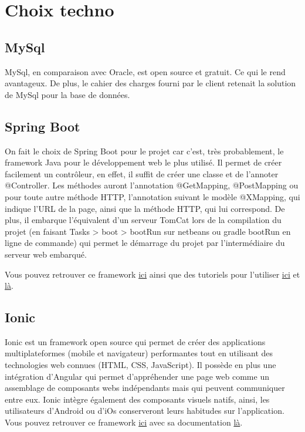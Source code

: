 	\section{Choix techno}

		\subsection{MySql}

			MySql, en comparaison avec Oracle, est open source et gratuit. Ce qui le rend avantageux. \newline
			De plus, le cahier des charges fourni par le client retenait la solution de MySql pour la base de données.

		\subsection{Spring Boot}

			On fait le choix de Spring Boot pour le projet car c'est, très probablement, le framework Java pour le développement web le plus utilisé. \newline
			Il permet de créer facilement un contrôleur, en effet, il suffit de créer une classe et de l’annoter @Controller. Les méthodes auront l’annotation @GetMapping, @PostMapping ou pour toute autre méthode HTTP, l'annotation suivant le modèle @XMapping, qui indique l'URL de la page, ainsi que la méthode HTTP, qui lui correspond.\newline
			De plus, il embarque l'équivalent d'un serveur TomCat lors de la compilation du projet (en faisant Tasks > boot > bootRun sur netbeans ou gradle bootRun en ligne de commande) qui permet le démarrage du projet par l'intermédiaire du serveur web embarqué. \newline

			\noindent
			Vous pouvez retrouver ce framework \href{https://spring.io/projects/spring-boot}{ici} ainsi que des tutoriels pour l'utiliser \href{https://www.tutorialspoint.com/spring_boot/index.htm}{ici} et \href{https://www.javatpoint.com/spring-boot-tutorial}{là}.

		\subsection{Ionic}

			Ionic est un framework open source qui permet de créer des applications multiplateformes (mobile et navigateur) performantes tout en utilisant des technologies web connues (HTML, CSS, JavaScript). Il possède en plus une intégration d'Angular qui permet d'appréhender une page web comme un assemblage de composants webs indépendants mais qui peuvent communiquer entre eux. \newline
			Ionic intègre également des composants visuels natifs, ainsi, les utilisateurs d'Android ou d'iOs conserveront leurs habitudes sur l'application. \newline
			Vous pouvez retrouver ce framework \href{https://ionicframework.com/docs/installation/cli}{ici} avec sa documentation \href{https://ionicframework.com/docs/components}{là}.

